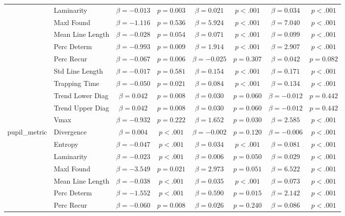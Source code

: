 \begin{tabular}{llcc|cc|cc}
 & Laminarity & $\beta = -0.013$ & $p = 0.003$ & $\beta = 0.021$ & $p < .001$ & $\beta = 0.034$ & $p < .001$ \\
 & Maxl Found & $\beta = -1.116$ & $p = 0.536$ & $\beta = 5.924$ & $p < .001$ & $\beta = 7.040$ & $p < .001$ \\
 & Mean Line Length & $\beta = -0.028$ & $p = 0.054$ & $\beta = 0.071$ & $p < .001$ & $\beta = 0.099$ & $p < .001$ \\
 & Perc Determ & $\beta = -0.993$ & $p = 0.009$ & $\beta = 1.914$ & $p < .001$ & $\beta = 2.907$ & $p < .001$ \\
 & Perc Recur & $\beta = -0.067$ & $p = 0.006$ & $\beta = -0.025$ & $p = 0.307$ & $\beta = 0.042$ & $p = 0.082$ \\
 & Std Line Length & $\beta = -0.017$ & $p = 0.581$ & $\beta = 0.154$ & $p < .001$ & $\beta = 0.171$ & $p < .001$ \\
 & Trapping Time & $\beta = -0.050$ & $p = 0.021$ & $\beta = 0.084$ & $p < .001$ & $\beta = 0.134$ & $p < .001$ \\
 & Trend Lower Diag & $\beta = 0.042$ & $p = 0.008$ & $\beta = 0.030$ & $p = 0.060$ & $\beta = -0.012$ & $p = 0.442$ \\
 & Trend Upper Diag & $\beta = 0.042$ & $p = 0.008$ & $\beta = 0.030$ & $p = 0.060$ & $\beta = -0.012$ & $p = 0.442$ \\
 & Vmax & $\beta = -0.932$ & $p = 0.222$ & $\beta = 1.652$ & $p = 0.030$ & $\beta = 2.585$ & $p < .001$ \\
\midrule
\multirow{12}{*}{pupil_metric} & Divergence & $\beta = 0.004$ & $p < .001$ & $\beta = -0.002$ & $p = 0.120$ & $\beta = -0.006$ & $p < .001$ \\
 & Entropy & $\beta = -0.047$ & $p < .001$ & $\beta = 0.034$ & $p < .001$ & $\beta = 0.081$ & $p < .001$ \\
 & Laminarity & $\beta = -0.023$ & $p < .001$ & $\beta = 0.006$ & $p = 0.050$ & $\beta = 0.029$ & $p < .001$ \\
 & Maxl Found & $\beta = -3.549$ & $p = 0.021$ & $\beta = 2.973$ & $p = 0.051$ & $\beta = 6.522$ & $p < .001$ \\
 & Mean Line Length & $\beta = -0.038$ & $p < .001$ & $\beta = 0.035$ & $p < .001$ & $\beta = 0.073$ & $p < .001$ \\
 & Perc Determ & $\beta = -1.552$ & $p < .001$ & $\beta = 0.590$ & $p = 0.015$ & $\beta = 2.142$ & $p < .001$ \\
 & Perc Recur & $\beta = -0.060$ & $p = 0.008$ & $\beta = 0.026$ & $p = 0.240$ & $\beta = 0.086$ & $p < .001$ \\

\end{tabular}
